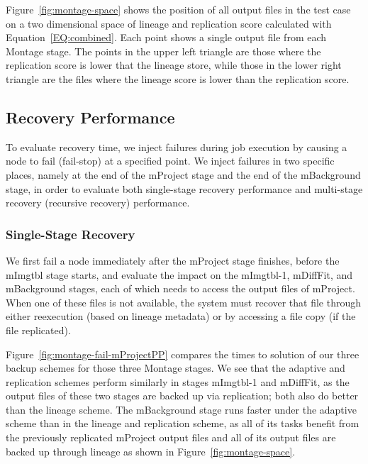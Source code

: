 \documentclass{sig-alternate}
\begin{document}
Figure~\ref{fig:montage-space} shows the position of all output files in the test case on a two dimensional space of lineage and replication score calculated with Equation~\ref{EQ:combined}.
Each point shows a single output file from each Montage stage. The points in the upper left triangle are those where the replication score is lower that the lineage store, 
while those in the lower right triangle are the files where the lineage score is lower than the replication score.

\subsection{Recovery Performance}
To evaluate recovery time, we inject failures during job execution by causing a node to fail (fail-stop) at a specified point.
We inject failures in two specific places, namely at the end of the mProject stage and the end of the mBackground stage,
in order to evaluate both single-stage recovery performance and multi-stage recovery (recursive recovery) performance.

\subsubsection{Single-Stage Recovery}
We first fail a node immediately after the mProject stage finishes, before the mImgtbl stage starts,
and evaluate the impact on the mImgtbl-1, mDiffFit, and mBackground stages, each of which
needs to access the output files of mProject.
When one of these files is not available, the system must recover that file through either reexecution (based on
lineage metadata) or by accessing a file copy (if the file replicated).

Figure~\ref{fig:montage-fail-mProjectPP} compares the times to solution of our three backup schemes for those three
Montage stages.
We see that the adaptive and replication schemes perform similarly in stages mImgtbl-1 and mDiffFit,
as the output files of these two stages are backed up via replication; both also do better than the lineage scheme.
The mBackground stage runs faster under the adaptive scheme than in the lineage and replication scheme,
as all of its tasks benefit from the previously replicated mProject output files and all of its output files are backed up through lineage as shown in Figure~\ref{fig:montage-space}.
\end{document}
